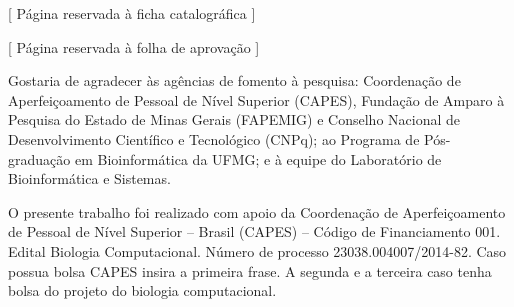 \documentclass[
	12pt,				%
	openright,			%
	oneside,			%
	a4paper,			%
	english,			%
	brazil				%
	]{abntex2}
\begin{document}

\frenchspacing 







\begin{fichacatalografica}

%     

[ Página reservada à ficha catalográfica ] 

\end{fichacatalografica}

\begin{folhadeaprovacao}
%     

[ Página reservada à folha de aprovação ]
  
\end{folhadeaprovacao}

\begin{agradecimentos}


Gostaria de agradecer às agências de fomento à pesquisa: Coordenação de Aperfeiçoamento de Pessoal de Nível Superior (CAPES), Fundação de Amparo à Pesquisa do Estado de Minas Gerais (FAPEMIG) e Conselho Nacional de Desenvolvimento Científico e Tecnológico (CNPq); ao Programa de Pós-graduação em Bioinformática da UFMG; e à equipe do Laboratório de Bioinformática e Sistemas.

O presente trabalho foi realizado com apoio da Coordenação de Aperfeiçoamento de Pessoal de Nível Superior – Brasil (CAPES) – Código de Financiamento 001. Edital Biologia Computacional. Número de processo 23038.004007/2014-82. Caso possua bolsa CAPES insira a primeira frase. A segunda e a terceira caso tenha bolsa do projeto do biologia computacional.


\end{agradecimentos}

\end{document}
